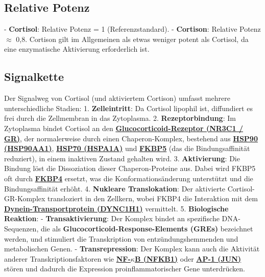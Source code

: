\documentclass{article}
\begin{document}
\subsection{Relative Potenz}
- \textbf{Cortisol}: Relative Potenz = 1 (Referenzstandard).
- \textbf{Cortison}: Relative Potenz $\approx$ 0,8. Cortison gilt im Allgemeinen als etwas weniger potent als Cortisol, da eine enzymatische Aktivierung erforderlich ist.

\subsection{Signalkette}
Der Signalweg von Cortisol (und aktiviertem Cortison) umfasst mehrere unterschiedliche Stadien:
1. \textbf{Zelleintritt}: Da Cortisol lipophil ist, diffundiert es frei durch die Zellmembran in das Zytoplasma.
2. \textbf{Rezeptorbindung}: Im Zytoplasma bindet Cortisol an den \textbf{\href{https://www.proteinatlas.org/ENSG00000113580-NR3C1}{Glucocorticoid-Rezeptor (NR3C1 / GR)}}, der normalerweise durch einen Chaperon-Komplex, bestehend aus \textbf{\href{https://www.proteinatlas.org/ENSG00000080824-HSP90AA1}{HSP90 (HSP90AA1)}}, \textbf{\href{https://www.proteinatlas.org/ENSG00000204389-HSPA1A}{HSP70 (HSPA1A)}} und \textbf{\href{https://www.proteinatlas.org/ENSG00000096060-FKBP5}{FKBP5}} (das die Bindungsaffinität reduziert), in einem inaktiven Zustand gehalten wird.
3. \textbf{Aktivierung}: Die Bindung löst die Dissoziation dieser Chaperon-Proteine aus. Dabei wird FKBP5 oft durch \textbf{\href{https://www.proteinatlas.org/ENSG00000004478-FKBP4}{FKBP4}} ersetzt, was die Konformationsänderung unterstützt und die Bindungsaffinität erhöht.
4. \textbf{Nukleare Translokation}: Der aktivierte Cortisol-GR-Komplex transloziert in den Zellkern, wobei FKBP4 die Interaktion mit dem \textbf{\href{https://www.proteinatlas.org/ENSG00000197102-DYNC1H1}{Dynein-Transportprotein (DYNC1H1)}} vermittelt.
5. \textbf{Biologische Reaktion}:
    - \textbf{Transaktivierung}: Der Komplex bindet an spezifische DNA-Sequenzen, die als \textbf{Glucocorticoid-Response-Elements (GREs)} bezeichnet werden, und stimuliert die Transkription von entzündungshemmenden und metabolischen Genen.
    - \textbf{Transrepression}: Der Komplex kann auch die Aktivität anderer Transkriptionsfaktoren wie \textbf{\href{https://www.proteinatlas.org/ENSG00000109320-NFKB1}{NF-\texorpdfstring{$\kappa$}{kappa}B (NFKB1)}} oder \textbf{\href{https://www.proteinatlas.org/ENSG00000177606-JUN}{AP-1 (JUN)}} stören und dadurch die Expression proinflammatorischer Gene unterdrücken.
\end{document}
